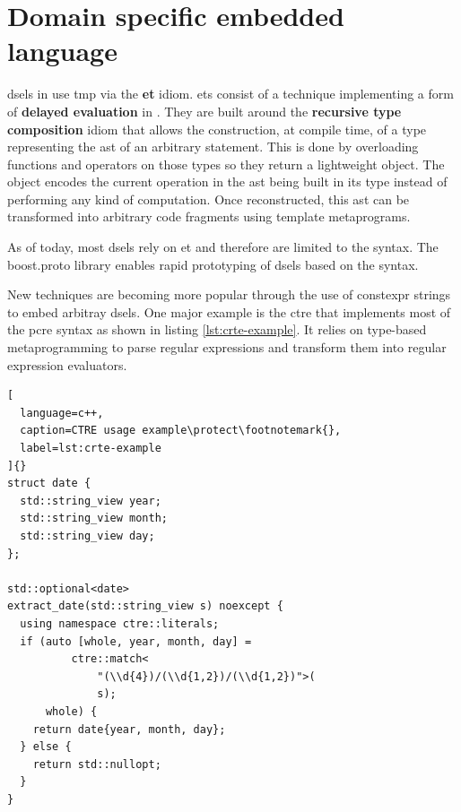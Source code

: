 \documentclass[../main]{subfiles}
\begin{document}
\section{
  Domain specific embedded language
}
\label{lbl:expression-level-metaprogramming}


\glspl{dsel} in \cpp use \gls{tmp} via the \textbf{\gls{et}} idiom.
\Glspl{et} \cite{veldhuizen:1995,vandevoorde:2002} consist of a
technique implementing a form of \textbf{delayed evaluation} in
\cpp \cite{spinellis:2001}. They are built around the
\textbf{recursive type composition} idiom \cite{jarvi:1998} that allows the
construction, at compile time, of a type representing the \gls{ast}
of an arbitrary statement.
This is done by overloading functions and operators on those types
so they return a lightweight object. The object encodes the current operation
in the \gls{ast} being built in its type instead of performing
any kind of computation. Once reconstructed, this \gls{ast} can be transformed
into arbitrary code fragments using template metaprograms.

As of today, most \cpp \glspl{dsel} rely on \gls{et} and therefore
are limited to the \cpp syntax. The boost.proto \cite{boost.proto} library
enables rapid prototyping of \glspl{dsel} based on the \cpp syntax.

New techniques are becoming more popular through
the use of \gls{constexpr} strings to embed arbitray
\glspl{dsel}. One major example is the \gls{ctre} \cite{ctre}
that implements most of the \gls{pcre} syntax as shown in
listing \ref{lst:crte-example}.
It relies on type-based metaprogramming to parse regular expressions and
transform them into regular expression evaluators.

\begin{lstlisting}[
  language=c++,
  caption=CTRE usage example\protect\footnotemark{},
  label=lst:crte-example
]{}
struct date {
  std::string_view year;
  std::string_view month;
  std::string_view day;
};

std::optional<date>
extract_date(std::string_view s) noexcept {
  using namespace ctre::literals;
  if (auto [whole, year, month, day] =
          ctre::match<
              "(\\d{4})/(\\d{1,2})/(\\d{1,2})">(
              s);
      whole) {
    return date{year, month, day};
  } else {
    return std::nullopt;
  }
}
\end{lstlisting}
\end{document}
